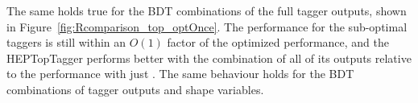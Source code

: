 The same holds true for the BDT combinations of the full tagger outputs, shown in Figure~\ref{fig:Rcomparison_top_optOnce}. The performance for the sub-optimal taggers is still within an $O(1)$ factor of the optimized performance, and the HEPTopTagger performs better with the combination of all of its outputs relative to the performance with just \topmass. The same behaviour holds for the BDT combinations of tagger outputs and shape variables. \\


\begin{figure}
\centering
{}

\end{figure}

